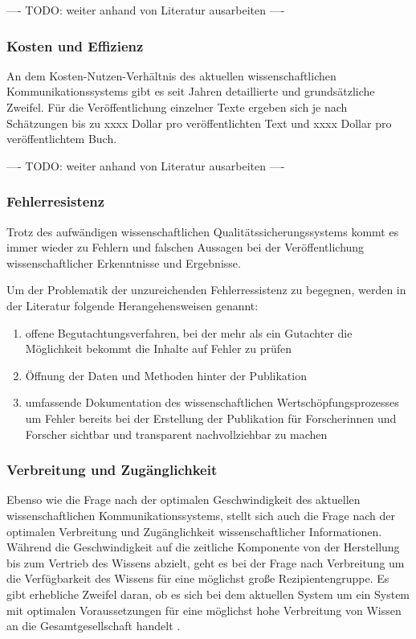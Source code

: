 ---- TODO: weiter anhand von Literatur ausarbeiten ----

\subsubsection{Kosten und Effizienz}

An dem Kosten-Nutzen-Verhältnis des aktuellen wissenschaftlichen Kommunikationssystems gibt es seit Jahren detaillierte und grundsätzliche Zweifel. Für die Veröffentlichung einzelner Texte ergeben sich je nach Schätzungen bis zu xxxx Dollar pro veröffentlichten Text und xxxx Dollar pro veröffentlichtem Buch.

---- TODO: weiter anhand von Literatur ausarbeiten ----

\subsubsection{Fehlerresistenz}

Trotz des aufwändigen wissenschaftlichen Qualitätssicherungssystems kommt es immer wieder zu Fehlern und falschen Aussagen bei der Veröffentlichung wissenschaftlicher Erkenntnisse und Ergebnisse.

Um der Problematik der unzureichenden Fehlerressistenz zu begegnen, werden in der Literatur folgende Herangehensweisen genannt:
\begin{enumerate}
\item offene Begutachtungsverfahren, bei der mehr als ein Gutachter die Möglichkeit bekommt die Inhalte auf Fehler zu prüfen \cite{suchen}
\item Öffnung der Daten und Methoden hinter der Publikation \cite{suchen}
\item umfassende Dokumentation des wissenschaftlichen Wertschöpfungsprozesses um Fehler bereits bei der Erstellung der Publikation für Forscherinnen und Forscher sichtbar und transparent nachvollziehbar zu machen \cite{suchen}
\end{enumerate}

\subsubsection{Verbreitung und Zugänglichkeit}

Ebenso wie die Frage nach der optimalen Geschwindigkeit des aktuellen wissenschaftlichen Kommunikationssystems, stellt sich auch die Frage nach der optimalen Verbreitung und Zugänglichkeit wissenschaftlicher Informationen. Während die Geschwindigkeit auf die zeitliche Komponente von der Herstellung bis zum Vertrieb des Wissens abzielt, geht es bei der Frage nach Verbreitung um die Verfügbarkeit des Wissens für eine möglichst große Rezipientengruppe. Es gibt erhebliche Zweifel daran, ob es sich bei dem aktuellen System um ein System mit optimalen Voraussetzungen für eine möglichst hohe Verbreitung von Wissen an die Gesamtgesellschaft handelt \cite{suchen}.

